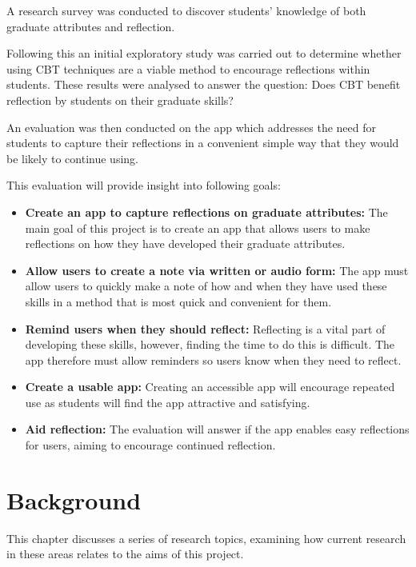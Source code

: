 \documentclass{l4proj}
\begin{document}
A research survey was conducted to discover students' knowledge of both graduate attributes and reflection.

Following this an initial exploratory study was carried out to determine whether using CBT techniques are a viable method to encourage reflections within students. These results were analysed to answer the question: Does CBT benefit reflection by students on their graduate skills?

An evaluation was then conducted on the app which addresses the need for students to capture their reflections in a convenient simple way that they would be likely to continue using. 
 
This evaluation will provide insight into following goals:
\begin{itemize}
    \item \textbf{Create an app to capture reflections on graduate attributes:} The main goal of this project is to create an app that allows users to make reflections on how they have developed their graduate attributes.
    \item \textbf{Allow users to create a note via written or audio form:} The app must allow users to quickly make a note of how and when they have used these skills in a method that is most quick and convenient for them.
    \item \textbf{Remind users when they should reflect:} Reflecting is a vital part of developing these skills, however, finding the time to do this is difficult. The app therefore must allow reminders so users know when they need to reflect.
    \item \textbf{Create a usable app:} Creating an accessible app will encourage repeated use as students will find the app attractive and satisfying.
    \item \textbf{Aid reflection:} The evaluation will answer if the app enables easy reflections for users, aiming to encourage continued reflection.
\end{itemize}


\chapter{Background} \label{Background}

This chapter discusses a series of research topics, examining how current research in these areas relates to the aims of this project.
\end{document}
